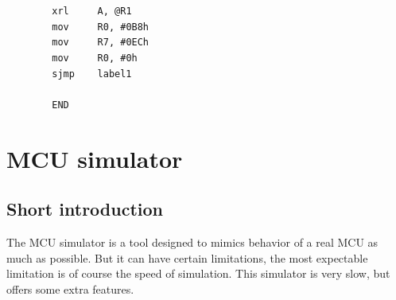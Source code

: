 \documentclass[a4paper,twoside,12pt]{book}
\begin{document}
\begin{minipage}{\textwidth}
\begin{minipage}[t]{.4\textwidth}
			\verb'        '{\color{highlight_instruction}\verb'xrl'}\verb'     '{\color{highlight_sfr}\verb'A'}{\color{highlight_oper_sep}\verb','}\verb' '{\color{highlight_indirect}\verb'@R1'}\\
			\verb'        '{\color{highlight_instruction}\verb'mov'}\verb'     '{\color{highlight_sfr}\verb'R0'}{\color{highlight_oper_sep}\verb','}\verb' '{\color{highlight_imm_hex}\verb'#0B8h'}\\
			\verb'        '{\color{highlight_instruction}\verb'mov'}\verb'     '{\color{highlight_sfr}\verb'R7'}{\color{highlight_oper_sep}\verb','}\verb' '{\color{highlight_imm_hex}\verb'#0ECh'}\\
			\verb'        '{\color{highlight_instruction}\verb'mov'}\verb'     '{\color{highlight_sfr}\verb'R0'}{\color{highlight_oper_sep}\verb','}\verb' '{\color{highlight_imm_hex}\verb'#0h'}\\
			\verb'        '{\color{highlight_instruction}\verb'sjmp'}\verb'    '{\color{highlight_constant}\verb'label1'}\\
			\verb''\\
			\verb'        '{\color{highlight_directive}\verb'END'}\\
		\end{minipage}
		\onecolumn
	\end{minipage}

\chapter{MCU simulator}
	\section{Short introduction}
		The MCU simulator is a tool designed to mimics behavior of a real MCU as much as possible. But it can have certain limitations, the most expectable  limitation is of course the speed of simulation. This simulator is very slow, but offers some extra features.
\end{document}
